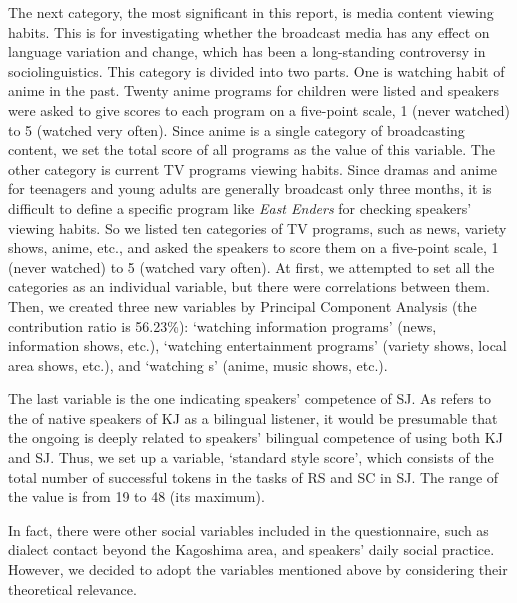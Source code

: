 \documentclass[output=paper]{LSP/langsci}
\begin{document}
The next category, the most significant in this report, is media content viewing habits. This is for investigating whether the broadcast media has any effect on language variation and change, which has been a long-standing controversy in sociolinguistics. This category is divided into two parts. One is watching habit of anime in the past. Twenty anime programs for children were listed and speakers were asked to give scores to each program on a five-point scale, 1 (never watched) to 5 (watched very often). Since anime is a single category of broadcasting content, we set the total score of all programs as the value of this variable. The other category is current TV programs viewing habits. Since dramas and anime for teenagers and young adults are generally broadcast only three months, it is difficult to define a specific program like \textit{East Enders} for checking speakers’ viewing habits. So we listed ten categories of TV programs, such as news, variety shows, anime, etc., and asked the speakers to score them on a five-point scale, 1 (never watched) to 5 (watched vary often). At first, we attempted to set all the categories as an individual variable, but there were correlations between them. Then, we created three new variables by Principal Component Analysis (the contribution ratio is 56.23\%): ‘watching information programs’ (news, information shows, etc.), ‘watching entertainment programs’ (variety shows, local area shows, etc.), and ‘watching s’ (anime, music shows, etc.).  

The last variable is the one indicating speakers’ competence of SJ. As \citet[324]{kubozono_tonal_2007} refers to the  of native speakers of KJ as a bilingual listener, it would be presumable that the ongoing  is deeply related to speakers’ bilingual competence of using both KJ and SJ. Thus, we set up a variable, ‘standard style score’, which consists of the total number of successful tokens in the tasks of RS and SC in SJ. The range of the value is from 19 to 48 (its maximum).

In fact, there were other social variables included in the questionnaire, such as dialect contact beyond the Kagoshima area, and speakers’ daily social practice. However, we decided to adopt the variables mentioned above by considering their theoretical relevance. 
\end{document}
